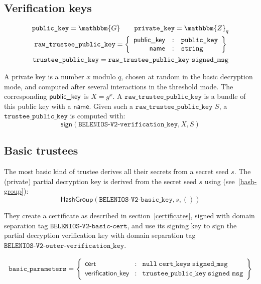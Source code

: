 \documentclass[a4paper]{article}
\newcommand{\dstprefix}{BELENIOS-V2}
\newcommand{\G}{\mathbbm{G}}
\newcommand{\Z}{\mathbbm{Z}}
\newcommand{\jstring}{\texttt{string}}
\newcommand{\tpk}{\texttt{trustee\_public\_key}}
\begin{document}
\subsection{Verification keys}
\label{trustee-keys}

\begin{gather*}
  \pk=\G\qquad\sk=\Z_q\\
  \texttt{raw\_trustee\_public\_key}=\left\{
    \begin{array}{rcl}
      \pklabel&:&\pk\\
      \textsf{name}&:&\jstring
    \end{array}
  \right\}\\
  \tpk=\texttt{raw\_trustee\_public\_key}\ \texttt{signed\_msg}
\end{gather*}

A private key is a number $x$ modulo $q$, chosen at random in the
basic decryption mode, and computed after several interactions in the
threshold mode.  The corresponding $\textsf{public\_key}$ is $X=g^x$. A
$\texttt{raw\_trustee\_public\_key}$ is a bundle of this public key
with a $\textsf{name}$. Given such a
$\texttt{raw\_trustee\_public\_key}$ $S$, a $\tpk$ is computed with:
\[\textsf{sign}(\texttt{\dstprefix-verification\_key},X,S)\]

\subsection{Basic trustees}
\label{basic-trustees}

The most basic kind of trustee derives all their secrets from a secret
seed $s$. The (private) partial decryption key is derived from the
secret seed $s$ using (see~\ref{hash-group}):
\[\textsf{HashGroup}(\texttt{\dstprefix-basic\_key},s,())\]

They create a certificate as described in section~\ref{certificates},
signed with domain separation tag $\texttt{\dstprefix-basic-cert}$,
and use its signing key to sign the partial decryption verification
key with domain separation tag
$\texttt{\dstprefix-outer-verification\_key}$.

\begin{gather*}
  \texttt{basic\_parameters}=\left\{
    \begin{array}{rcl}
      \textsf{cert}&:&\texttt{null}\ \texttt{cert\_keys}\ \texttt{signed\_msg}\\
      \textsf{verification\_key}&:&\texttt{trustee\_public\_key}\ \texttt{signed\ msg}
    \end{array}
  \right\}\\
\end{gather*}
\end{document}
